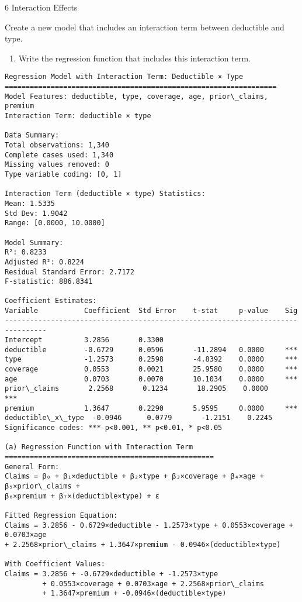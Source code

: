 \documentclass[8pt, twocolumn]{extarticle}
\providecommand{\tightlist}{%
      \setlength{\itemsep}{0pt}\setlength{\parskip}{0pt}}
\begin{document}
    6 Interaction Effects

Create a new model that includes an interaction term between deductible
and type.

    \begin{enumerate}
\def\labelenumi{(\alph{enumi})}
\tightlist
\item
  Write the regression function that includes this interaction term.
\end{enumerate}

    \begin{Verbatim}[commandchars=\\\{\}]
Regression Model with Interaction Term: Deductible × Type
=================================================================
Model Features: deductible, type, coverage, age, prior\_claims, premium
Interaction Term: deductible × type

Data Summary:
Total observations: 1,340
Complete cases used: 1,340
Missing values removed: 0
Type variable coding: [0, 1]

Interaction Term (deductible × type) Statistics:
Mean: 1.5335
Std Dev: 1.9042
Range: [0.0000, 10.0000]

Model Summary:
R²: 0.8233
Adjusted R²: 0.8224
Residual Standard Error: 2.7172
F-statistic: 886.8341

Coefficient Estimates:
Variable           Coefficient  Std Error    t-stat     p-value    Sig
--------------------------------------------------------------------------------
Intercept          3.2856       0.3300
deductible         -0.6729      0.0596       -11.2894   0.0000     ***
type               -1.2573      0.2598       -4.8392    0.0000     ***
coverage           0.0553       0.0021       25.9580    0.0000     ***
age                0.0703       0.0070       10.1034    0.0000     ***
prior\_claims       2.2568       0.1234       18.2905    0.0000     ***
premium            1.3647       0.2290       5.9595     0.0000     ***
deductible\_x\_type  -0.0946      0.0779       -1.2151    0.2245
Significance codes: *** p<0.001, ** p<0.01, * p<0.05

(a) Regression Function with Interaction Term
==================================================
General Form:
Claims = β₀ + β₁×deductible + β₂×type + β₃×coverage + β₄×age + β₅×prior\_claims +
β₆×premium + β₇×(deductible×type) + ε

Fitted Regression Equation:
Claims = 3.2856 - 0.6729×deductible - 1.2573×type + 0.0553×coverage + 0.0703×age
+ 2.2568×prior\_claims + 1.3647×premium - 0.0946×(deductible×type)

With Coefficient Values:
Claims = 3.2856 + -0.6729×deductible + -1.2573×type
         + 0.0553×coverage + 0.0703×age + 2.2568×prior\_claims
         + 1.3647×premium + -0.0946×(deductible×type)
    \end{Verbatim}
\end{document}
